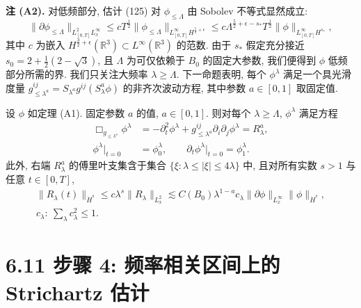 \textbf{注 (A2).} 对低频部分, 估计 (125) 对 $\phi_{\leq\Lambda}$ 由 Sobolev 不等式显然成立:
\begin{equation}
\|\partial\phi_{\leq\Lambda}\|_{L_{[0,T]}^2L_x^\infty}\leq cT^{\frac12}\|\phi_{\leq\Lambda}\|_{L_{[0,T]}^\infty H^{\frac52+\epsilon}}\leq c\Lambda^{\frac52+\epsilon-s_*}T^{\frac12}\|\phi\|_{L_{[0,T]}^\infty H^{s_*}},\end{equation}
其中 $c$ 为嵌入 $H^{\frac32+\epsilon}(\mathbb{R}^3)\subset L^\infty(\mathbb{R}^3)$ 的范数. 由于 $s_*$ 假定充分接近 $s_0=2+\frac12(2-\sqrt3)$, 且 $\Lambda$ 为可仅依赖于 $B_0$ 的固定大参数, 我们便得到 $\phi$ 低频部分所需的界.
我们只关注大频率 $\lambda\geq\Lambda$. 下一命题表明, 每个 $\phi^\lambda$ 满足一个具光滑度量 $g_{\leq\lambda^a}^{ij}=S_{\lambda^a}g^{ij}(S_\lambda^a\phi)$ 的非齐次波动方程, 其中参数 $a\in[0,1]$ 取固定值.
\begin{proposition}\label{prop:6.10}
设 $\phi$ 如定理 (A1). 固定参数 $a$ 的值, $a\in[0,1]$. 则对每个 $\lambda\geq\Lambda$, $\phi^\lambda$ 满足方程
\begin{equation}
\begin{aligned}
\Box_{g_{\leq\lambda^a}}\phi^\lambda&=-\partial_t^2\phi^\lambda+g_{\leq\lambda^a}^{ij}\partial_i\partial_j\phi^\lambda=R_\lambda^a,\\
\phi^\lambda|_{t=0}&=\phi_0^\lambda,\qquad \partial_t\phi^\lambda|_{t=0}=\phi_1^\lambda.\end{aligned}
\end{equation}
此外, 右端 $R_\lambda^a$ 的傅里叶支集含于集合 $\{\xi:\lambda\leq|\xi|\leq 4\lambda\}$ 中, 且对所有实数 $s>1$ 与任意 $t\in[0,T]$,
\begin{gather}
\|R_\lambda(t)\|_{\dot H^s}\leq c\lambda^s\|R_\lambda\|_{L_x^2}\lesssim C(B_0)\lambda^{1-a}c_\lambda\|\partial\phi\|_{L_x^\infty}\|\phi\|_{\dot H^s},\\
c_\lambda:\ \sum_\lambda c_\lambda^2\leq 1.\end{gather}
\end{proposition}

\setcounter{mtthm}{11}%

\section*{6.11 步骤 4: 频率相关区间上的 Strichartz 估计}


